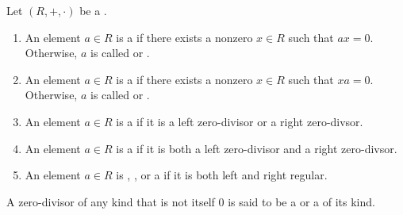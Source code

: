 
\begin{definition} \label{definition:zero_divisor_of_a_ring}
    Let $(R,+,\cdot)$ be a .
    \begin{enumerate}
        \item An element $a \in R$ is a  if there exists a nonzero $x \in R$ such that $ax = 0$. Otherwise, $a$ is called  or .
        \item An element $a \in R$ is a  if there exists a nonzero $x \in R$ such that $xa = 0$. Otherwise, $a$ is called  or .

        \item An element $a \in R$ is a  if it is a left zero-divisor or a right zero-divsor.
        \item An element $a \in R$ is a  if it is both a left zero-divisor and a right zero-divsor.

        \item An element $a \in R$ is , , or a  if it is both left and right regular.
    \end{enumerate}

    A zero-divisor of any kind that is not itself $0$ is said to be a  or a  of its kind. 
    
\end{definition}

